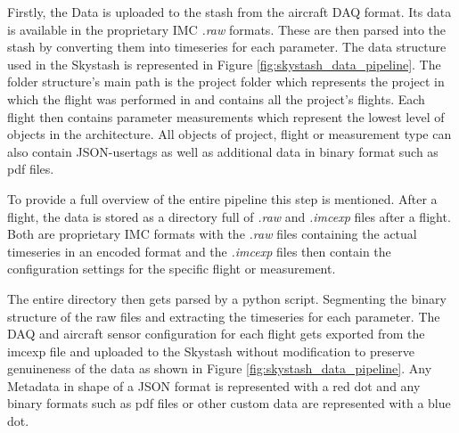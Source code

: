 Firstly, the Data is uploaded to the stash from the aircraft DAQ format. Its data is available in the proprietary IMC \textit{.raw} formats. These are then parsed into the stash by converting them into timeseries for each parameter. The data structure used in the Skystash is represented in Figure \ref{fig:skystash_data_pipeline}. The folder structure's main path is the project folder which represents the project in which the flight was performed in and contains all the project's flights. Each flight then contains parameter measurements which represent the lowest level of objects in the architecture. All objects of project, flight or measurement type can also contain JSON-usertags as well as additional data in binary format such as pdf files.




To provide a full overview of the entire pipeline this step is mentioned. After a flight, the data is stored as a directory full of \textit{.raw} and \textit{.imcexp} files after a flight. Both are proprietary IMC formats with the \textit{.raw} files containing the actual timeseries in an encoded format and the \textit{.imcexp} files then contain the configuration settings for the specific flight or measurement.

The entire directory then gets parsed by a python script. Segmenting the binary structure of the raw files and extracting the timeseries for each parameter. The DAQ and aircraft sensor configuration for each flight gets exported from the imcexp file and uploaded to the Skystash without modification to preserve genuineness of the data as shown in Figure \ref{fig:skystash_data_pipeline}. Any Metadata in shape of a JSON format is represented with a red dot and any binary formats such as pdf files or other custom data are represented with a blue dot.

